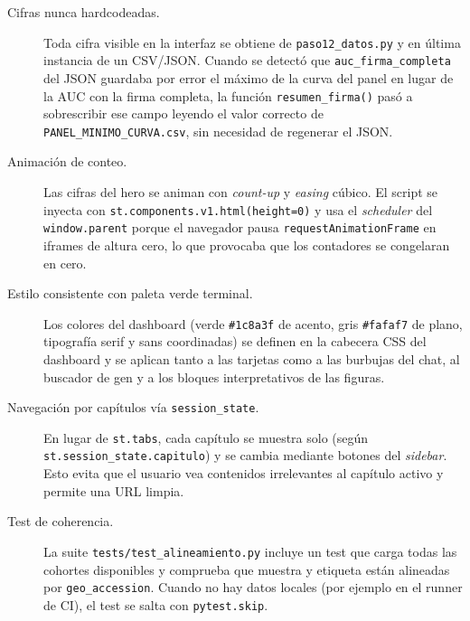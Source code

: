 \begin{description}
  \item[Cifras nunca hardcodeadas.] Toda cifra visible en la interfaz se
  obtiene de \texttt{paso12\_datos.py} y en última instancia de un
  CSV/JSON. Cuando se detectó que \texttt{auc\_firma\_completa} del JSON
  guardaba por error el máximo de la curva del panel en lugar de la AUC
  con la firma completa, la función \texttt{resumen\_firma()} pasó a
  sobrescribir ese campo leyendo el valor correcto de
  \texttt{PANEL\_MINIMO\_CURVA.csv}, sin necesidad de regenerar el JSON.

  \item[Animación de conteo.] Las cifras del hero se animan con
  \emph{count-up} y \emph{easing} cúbico. El script se inyecta con
  \texttt{st.components.v1.html(height=0)} y usa el \emph{scheduler}
  del \texttt{window.parent} porque el navegador pausa
  \texttt{requestAnimationFrame} en iframes de altura cero, lo que
  provocaba que los contadores se congelaran en cero.

  \item[Estilo consistente con paleta verde terminal.] Los colores del
  dashboard (verde \texttt{\#1c8a3f} de acento, gris \texttt{\#fafaf7}
  de plano, tipografía serif y sans coordinadas) se definen en la
  cabecera CSS del dashboard y se aplican tanto a las tarjetas como a
  las burbujas del chat, al buscador de gen y a los bloques
  interpretativos de las figuras.

  \item[Navegación por capítulos vía \texttt{session\_state}.] En lugar
  de \texttt{st.tabs}, cada capítulo se muestra solo (según
  \texttt{st.session\_state.capitulo}) y se cambia mediante botones del
  \emph{sidebar}. Esto evita que el usuario vea contenidos irrelevantes
  al capítulo activo y permite una URL limpia.

  \item[Test de coherencia.] La suite \texttt{tests/test\_alineamiento.py}
  incluye un test que carga todas las cohortes disponibles y comprueba
  que muestra y etiqueta están alineadas por \texttt{geo\_accession}.
  Cuando no hay datos locales (por ejemplo en el runner de CI), el test
  se salta con \texttt{pytest.skip}.
\end{description}
